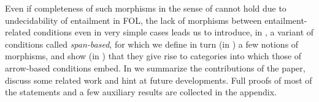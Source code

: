 Even if completeness of such morphisms in the sense of \cite{DBLP:conf/stoc/ChandraM77} cannot hold due to undecidability of entailment in FOL, the lack of morphisms between entailment-related conditions even in very simple cases leads us to introduce, in , a variant of conditions called \emph{span-based}, for which we define in turn (in ) a few notions of morphisms, and show (in ) that they give rise to categories into which those of arrow-based conditions embed.
In  we summarize the contributions of the paper, discuss some related work and hint at future developments. Full proofs of most of the statements and a few auxiliary results are collected in the appendix.


 